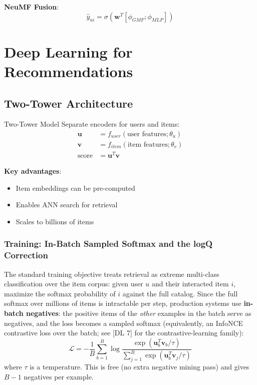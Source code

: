 \textbf{NeuMF Fusion}:
\begin{equation}
\hat{y}_{ui} = \sigma(\mathbf{w}^T[\phi_{GMF}; \phi_{MLP}])
\end{equation}

\section{Deep Learning for Recommendations}
\label{sr:sec:deep_recsys}

\subsection{Two-Tower Architecture}
\label{sr:sec:two_tower}

\begin{mathresult}{Two-Tower Model}
Separate encoders for users and items:
\begin{align}
\mathbf{u} &= f_{user}(\text{user features}; \theta_u) \\
\mathbf{v} &= f_{item}(\text{item features}; \theta_v) \\
\text{score} &= \mathbf{u}^T \mathbf{v}
\end{align}
\end{mathresult}

\textbf{Key advantages}:
\begin{itemize}
    \item Item embeddings can be pre-computed
    \item Enables ANN search for retrieval
    \item Scales to billions of items
\end{itemize}

\subsubsection{Training: In-Batch Sampled Softmax and the logQ Correction}

The standard training objective treats retrieval as extreme multi-class classification over the item corpus: given user $u$ and their interacted item $i$, maximize the softmax probability of $i$ against the full catalog. Since the full softmax over millions of items is intractable per step, production systems use \textbf{in-batch negatives}: the positive items of the \textit{other} examples in the batch serve as negatives, and the loss becomes a sampled softmax (equivalently, an InfoNCE contrastive loss over the batch; see [DL 7] for the contrastive-learning family):
\begin{equation}
\mathcal{L} = -\frac{1}{B}\sum_{b=1}^{B} \log \frac{\exp(\mathbf{u}_b^T \mathbf{v}_b / \tau)}{\sum_{j=1}^{B} \exp(\mathbf{u}_b^T \mathbf{v}_j / \tau)}
\end{equation}
where $\tau$ is a temperature. This is free (no extra negative mining pass) and gives $B-1$ negatives per example.

